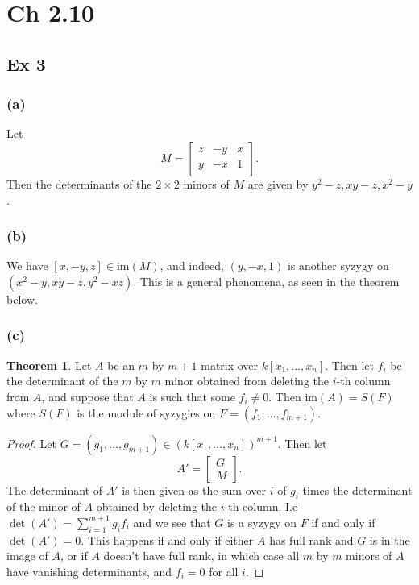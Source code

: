 \documentclass{article}
\theoremstyle{definition}
\newtheorem{theorem}{Theorem}[section]
\newcommand{\im}{\text{im}}
\begin{document}
\section*{Ch 2.10}
\subsection*{Ex 3}

\subsubsection*{(a)}

Let 
\[
	M =
	\begin{bmatrix}
		z & -y & x \\
		y & -x & 1
	\end{bmatrix}.
\] 
Then the determinants of the $2 \times 2$ minors of $M$ are given by $y^2 - z,
xy - z, x^2 - y$.

\subsubsection*{(b)}

We have $[x, -y, z] \in \im(M)$, and indeed, $(y, -x, 1)$ is another syzygy on
$(x^2 - y, xy - z, y^2 - xz)$. This is a general phenomena, as seen in the
theorem below.

\subsubsection*{(c)}

\begin{theorem}
	Let $A$ be an $m$ by $m + 1$ matrix over $k[x_1, \ldots, x_n]$. Then let
	$f_i$ be the determinant of the $m$ by $m$ minor obtained from deleting the
	$i$-th column from $A$, and suppose that $A$ is such that some $f_i \not =
	0$. Then $\im(A) = S(F)$ where $S(F)$ is the module of syzygies on $F =
	(f_1, \ldots, f_{m + 1})$.
\end{theorem}
\begin{proof}
	Let $G = (g_1, \ldots, g_{m + 1}) \in (k[x_1, \ldots, x_n])^{m + 1}$. Then let
	\[
		A' =
		\begin{bmatrix}
			G \\
			M
		\end{bmatrix}.
	\]
	The determinant of $A'$ is then given as the sum over $i$ of $g_i$ times
	the determinant of the minor of $A$ obtained by deleting the $i$-th column.
	I.e $\det(A') = \sum_{i = 1}^{m + 1} g_i f_i$ and we see that $G$ is a
	syzygy on $F$ if and only if $\det(A') = 0$. This happens if and only if
	either $A$ has full rank and $G$ is in the image of $A$, or if $A$ doesn't
	have full rank, in which case all $m$ by $m$ minors of $A$ have vanishing
	determinants, and $f_i = 0$ for all $i$.
\end{proof}
\end{document}
